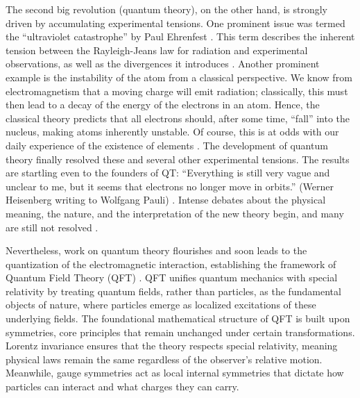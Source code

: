 The second big revolution (quantum theory), on the other hand, is strongly
driven by accumulating experimental tensions. One prominent issue was termed
the ``ultraviolet catastrophe'' by Paul Ehrenfest
\cite{ehrenfestWelcheZugeLichtquantenhypothese1911}. This term describes the
inherent tension between the Rayleigh-Jeans law for radiation and experimental
observations, as well as the divergences it introduces
\cite{bartelmannTheoretischePhysik32018a}. Another prominent
example is the instability of the atom from a classical perspective. We know
from electromagnetism that a moving charge will emit radiation; classically,
this must then lead to a decay of the energy of the electrons in an atom.
Hence, the classical theory predicts that all electrons should, after some
time, ``fall'' into the nucleus, making atoms inherently unstable. Of course,
this is at odds with our daily experience of the existence of elements
\cite{bartelmannTheoretischePhysik32018a}. The development of
quantum theory finally resolved these and several other experimental tensions.
The results are startling even to the founders of QT: ``Everything is still
very vague and unclear to me, but it seems that electrons no longer move in
orbits.'' (Werner Heisenberg writing to Wolfgang Pauli)
\cite{polettiStrangenessQuantumMechanics2022}. Intense debates about the
physical meaning, the nature, and the interpretation of the new theory begin,
and many are still not resolved
\cite{jahnertRevisiting1927Solvay2012,cushingQuantumMechanicsHistorical1995}.

Nevertheless, work on quantum theory flourishes and soon leads to the
quantization of the electromagnetic interaction, establishing the framework of
Quantum Field Theory (QFT) \cite{diracQuantumTheoryEmission1997}. QFT unifies
quantum mechanics with special relativity by treating quantum fields, rather
than particles, as the fundamental objects of nature, where particles emerge as
localized excitations of these underlying fields. The foundational mathematical
structure of QFT is built upon symmetries, core principles that remain
unchanged under certain transformations. Lorentz invariance ensures that the
theory respects special relativity, meaning physical laws remain the same
regardless of the observer's relative motion. Meanwhile, gauge symmetries act
as local internal symmetries that dictate how particles can interact and what
charges they can carry. 


